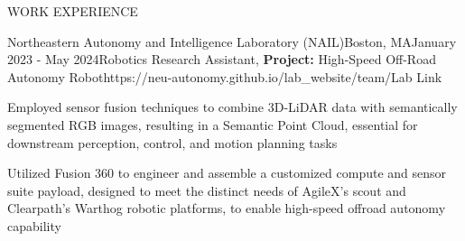 \documentclass{resume} %
\begin{document}
\begin{rSection}{WORK EXPERIENCE}
\begin{rProjExpDetails}{Northeastern Autonomy and Intelligence Laboratory (NAIL)}{Boston, MA}{January 2023 - May 2024}{Robotics Research Assistant, \textbf{Project:} High-Speed Off-Road Autonomy Robot}{https://neu-autonomy.github.io/lab_website/team/}{Lab Link}
		\item Employed sensor fusion techniques to combine 3D-LiDAR data with semantically segmented RGB images, resulting in a Semantic Point Cloud, essential for downstream perception, control, and motion planning tasks
		\item Utilized Fusion 360 to engineer and assemble a customized compute and sensor suite payload, designed to meet the distinct needs of AgileX's scout and Clearpath's Warthog robotic platforms, to enable high-speed offroad autonomy capability
	\end{rProjExpDetails}


\end{rSection}
\end{document}
